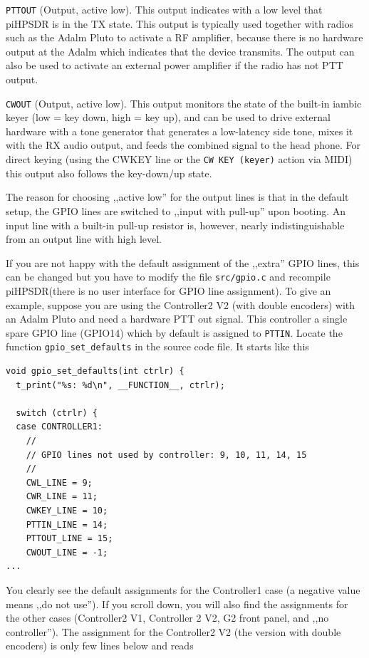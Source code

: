 \documentclass[12pt]{book}
\def\rett#1{\texttt{\color{red}#1}}
\def\bltt#1{\texttt{\color{blue}#1}}
\def\pH{pi\-HPSDR\xspace}
\begin{document}
\rett{PTTOUT} (Output, active low). This output indicates with a low level that \pH is in the
TX state. This output is typically used together with radios such as the Adalm Pluto to activate
a RF amplifier, because there is no hardware output at the Adalm which indicates that the device
transmits. The output can also be used to activate an external power amplifier if the radio has
not PTT output.

\rett{CWOUT} (Output, active low). This output monitors the state of the built-in iambic keyer
(low = key down, high = key up), and can be used to drive external hardware with a tone generator
that generates a low-latency side tone, mixes it with the RX audio output, and feeds the combined
signal to the head phone. For direct keying (using the CWKEY line or the \bltt{CW KEY (keyer)}
action via MIDI) this output also
follows the key-down/up state.

The reason for choosing ,,active low'' for the output lines is that in the default setup,
the GPIO lines are switched
to ,,input with pull-up'' upon booting. An input line with a built-in pull-up
resistor is, however,
nearly indistinguishable from an output line with high level.

If you are not happy with the default assignment of the ,,extra'' GPIO lines, this can be changed
but you have to modify the file \texttt{src/gpio.c} and recompile \pH (there is no user interface
for GPIO line assignment). To give an example, suppose you are using the Controller2 V2 (with double
encoders) with an Adalm Pluto and need a hardware PTT out signal. This controller a single spare GPIO line
(GPIO14) which by default is assigned to \rett{PTTIN}. Locate the function \texttt{gpio\_set\_defaults}
in the source code file. It starts like this

\begin{small}
\begin{verbatim}
void gpio_set_defaults(int ctrlr) {
  t_print("%s: %d\n", __FUNCTION__, ctrlr);

  switch (ctrlr) {
  case CONTROLLER1:
    //
    // GPIO lines not used by controller: 9, 10, 11, 14, 15
    //
    CWL_LINE = 9;
    CWR_LINE = 11;
    CWKEY_LINE = 10;
    PTTIN_LINE = 14;
    PTTOUT_LINE = 15;
    CWOUT_LINE = -1;
...
\end{verbatim}
\end{small}

You clearly see the default assignments for the Controller1 case (a negative value means ,,do not use'').
If you scroll down, you will also find the assignments for the other cases (Controller2 V1, Controller 2 V2,
G2 front panel, and ,,no controller''). The assignment for the Controller2 V2 (the version with double
encoders) is only few lines below and reads
\end{document}
